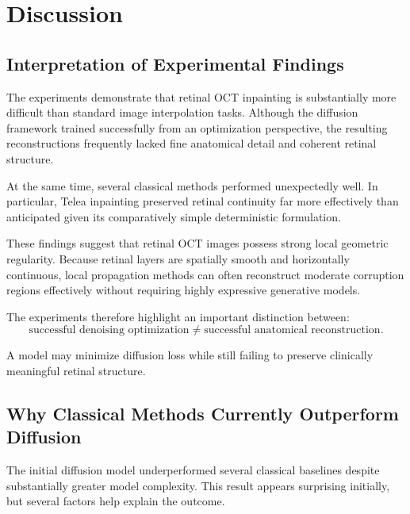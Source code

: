 \documentclass[12pt,oneside]{article}
\begin{document}
\section{Discussion}

\subsection*{Interpretation of Experimental Findings}

The experiments demonstrate that retinal OCT inpainting is substantially more difficult than standard image interpolation tasks. Although the diffusion framework trained successfully from an optimization perspective, the resulting reconstructions frequently lacked fine anatomical detail and coherent retinal structure.

At the same time, several classical methods performed unexpectedly well. In particular, Telea inpainting preserved retinal continuity far more effectively than anticipated given its comparatively simple deterministic formulation.

These findings suggest that retinal OCT images possess strong local geometric regularity. Because retinal layers are spatially smooth and horizontally continuous, local propagation methods can often reconstruct moderate corruption regions effectively without requiring highly expressive generative models.

The experiments therefore highlight an important distinction between:
\[
\text{successful denoising optimization}
\neq
\text{successful anatomical reconstruction}.
\]

A model may minimize diffusion loss while still failing to preserve clinically meaningful retinal structure.

\subsection*{Why Classical Methods Currently Outperform Diffusion}

The initial diffusion model underperformed several classical baselines despite substantially greater model complexity. This result appears surprising initially, but several factors help explain the outcome.
\end{document}
